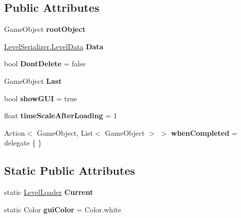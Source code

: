 \subsection*{Public Attributes}
\begin{DoxyCompactItemize}
\item 
\mbox{\label{class_level_loader_a8ed3459de6f3a6ba1be8970a0f6ddfc8}} 
Game\+Object {\bfseries root\+Object}
\item 
\mbox{\label{class_level_loader_a8282d4018064b62c2468d0cb3646f8d3}} 
\hyperlink{class_level_serializer_1_1_level_data}{Level\+Serializer.\+Level\+Data} {\bfseries Data}
\item 
\mbox{\label{class_level_loader_a714e188fb9511faaf73917bb4ec05404}} 
bool {\bfseries Dont\+Delete} = false
\item 
\mbox{\label{class_level_loader_a5adcee44265a6f1e54d2d7f914b26315}} 
Game\+Object {\bfseries Last}
\item 
\mbox{\label{class_level_loader_a925df477df93274b0d6565a0978f8c76}} 
bool {\bfseries show\+G\+UI} = true
\item 
\mbox{\label{class_level_loader_a3f36bc55abdef7cf8d6e42023c8f9397}} 
float {\bfseries time\+Scale\+After\+Loading} = 1
\item 
\mbox{\label{class_level_loader_aa0e135d1e8f6942d593dc7c2ac3769d7}} 
Action$<$ Game\+Object, List$<$ Game\+Object $>$ $>$ {\bfseries when\+Completed} = delegate \{ \}
\end{DoxyCompactItemize}
\subsection*{Static Public Attributes}
\begin{DoxyCompactItemize}
\item 
\mbox{\label{class_level_loader_a3f8fbb282f97d8aeaf499d94b0ed6a4b}} 
static \hyperlink{class_level_loader}{Level\+Loader} {\bfseries Current}
\item 
\mbox{\label{class_level_loader_a35d760bc734b8b2c76fb49147ffd7109}} 
static Color {\bfseries gui\+Color} = Color.\+white
\end{DoxyCompactItemize}
